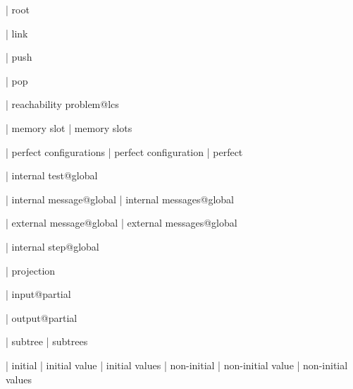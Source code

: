 | root

| link

| push

| pop

| reachability problem@lcs


| memory slot
| memory slots

| perfect configurations
| perfect configuration
| perfect


| internal test@global

| internal message@global
| internal messages@global

| external message@global
| external messages@global

| internal step@global


| projection

| input@partial

| output@partial

| subtree
| subtrees

| initial
| initial value
| initial values
| non-initial
| non-initial value
| non-initial values